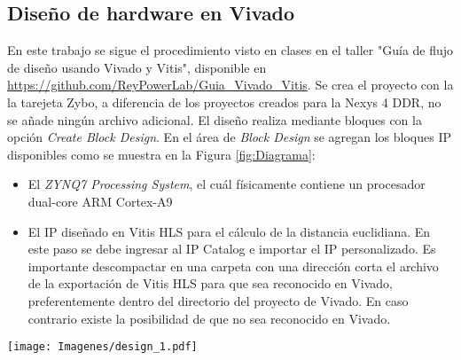 \documentclass[conference]{IEEEtran}
\begin{document}
 \subsection{Diseño de hardware en Vivado}
 En este trabajo se sigue el  procedimiento visto en clases en el taller "Guía de flujo de diseño usando Vivado y Vitis", disponible en \url{https://github.com/ReyPowerLab/Guia_Vivado_Vitis}. Se crea el proyecto con la la tarejeta Zybo, a diferencia de los proyectos creados para la Nexys 4 DDR, no se añade ningún archivo adicional. El diseño realiza mediante bloques con la opción \textit{Create Block Design}. En el área de \textit{Block Design}  se agregan  los bloques IP disponibles como se muestra en la Figura \ref{fig:Diagrama}:
 \begin{itemize}
     \item El  \textit{ZYNQ7 Processing System}, el cuál físicamente  contiene un procesador dual-core ARM Cortex-A9
     \item El IP diseñado en Vitis HLS para el cálculo de la distancia euclidiana. En este paso se debe ingresar al IP Catalog e importar el IP personalizado. Es importante descompactar en una carpeta con una dirección corta el archivo  de la exportación de Vitis HLS para que sea reconocido en Vivado, preferentemente dentro del directorio del proyecto de Vivado. En caso contrario existe la posibilidad de que no sea reconocido en Vivado. 
 \end{itemize} 
   \begin{figure*}[]
    \centering
    \texttt{[image: Imagenes/design\_1.pdf]}
    \caption{Diagrama de bloques de alto nivel  para operaciones sobre vectores implementado en la Zybo.}
    \label{fig:Diagrama}
\end{figure*}
\end{document}
